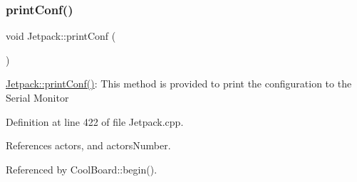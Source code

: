 \subsubsection{\texorpdfstring{print\+Conf()}{printConf()}}
{\footnotesize\ttfamily void Jetpack\+::print\+Conf (\begin{DoxyParamCaption}{ }\end{DoxyParamCaption})}

\hyperlink{classJetpack_ac54a7bb4f9166bee32052253d9b1d306}{Jetpack\+::print\+Conf()}\+: This method is provided to print the configuration to the Serial Monitor 

Definition at line 422 of file Jetpack.\+cpp.



References actors, and actors\+Number.



Referenced by Cool\+Board\+::begin().


